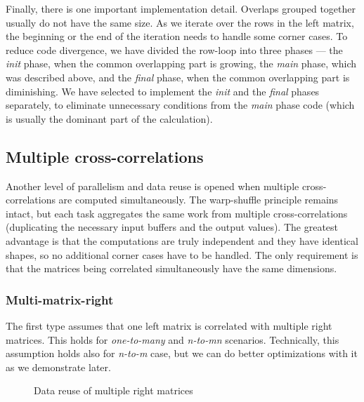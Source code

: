 Finally, there is one important implementation detail. Overlaps grouped together usually do not have the same size. As we iterate over the rows in the left matrix, the beginning or the end of the iteration needs to handle some corner cases. To reduce code divergence, we have divided the row-loop into three phases --- the \emph{init} phase, when the common overlapping part is growing, the \emph{main} phase, which was described above, and the \emph{final} phase, when the common overlapping part is diminishing. We have selected to implement the \emph{init} and the \emph{final} phases separately, to eliminate unnecessary conditions from the \emph{main} phase code (which is usually the dominant part of the calculation).


\subsection{Multiple cross-correlations}

Another level of parallelism and data reuse is opened when multiple cross-correlations are computed simultaneously. The warp-shuffle principle remains intact, but each task aggregates the same work from multiple cross-correlations (duplicating the necessary input buffers and the output values). The greatest advantage is that the computations are truly independent and they have identical shapes, so no additional corner cases have to be handled. The only requirement is that the matrices being correlated simultaneously have the same dimensions.

\subsubsection{Multi-matrix-right}

The first type assumes that one left matrix is correlated with multiple right matrices. This holds for \textit{one-to-many} and \textit{n-to-mn} scenarios. Technically, this assumption holds also for \textit{n-to-m} case, but we can do better optimizations with it as we demonstrate later.

\begin{figure}[ht]
	\centering
	\def\svgwidth{0.8\textwidth}
	\fontsize{9}{12}\selectfont
	
	\caption{Data reuse of multiple right matrices}
	\label{fig:warpshuffle-multi-right}
\end{figure}


